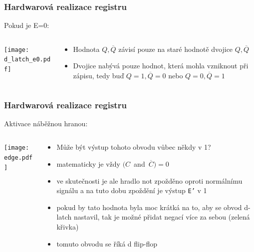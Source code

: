 \documentclass{beamer}
\begin{document}
\begin{frame}
\frametitle{Hardwarová realizace registru}

Pokud je E=0:
\begin{columns}
\begin{column}{0.5\textwidth}
\begin{center}
\texttt{[image: d\_latch\_e0.pdf]}
\end{center}
\end{column}
\begin{column}{0.5\textwidth}  
\begin{itemize}
\item Hodnota $Q,\overline{Q}$ závisí pouze na staré hodnotě dvojice $Q,\overline{Q}$
\item Dvojice nabývá pouze hodnot, která mohla vzniknout při zápisu, tedy buď $Q=1,\overline{Q}=0$ nebo $Q=0,\overline{Q}=1$
\end{itemize}
\end{column}
\end{columns}

\end{frame}

\begin{frame}
\frametitle{Hardwarová realizace registru}

Aktivace náběžnou hranou:
\begin{columns}
\begin{column}{0.45\textwidth}
\begin{center}
\texttt{[image: edge.pdf]}
\end{center}
\end{column}
\begin{column}{0.55\textwidth}  
\begin{itemize}
\item Může být výstup tohoto obvodu vůbec někdy v 1?
\item matematicky je vždy $(C$~and~$\overline{C})=0$ 
\item ve skutečnosti je ale hradlo not zpožděno oproti normálnímu signálu a na tuto dobu zpoždění je výstup \texttt{E'} v 1
\item pokud by tato hodnota byla moc krátká na to, aby se obvod d-latch nastavil, tak je možné přidat negací více za sebou (zelená křivka)
\item tomuto obvodu se říká d flip-flop
\end{itemize}
\end{column}
\end{columns}

\end{frame}
\end{document}
